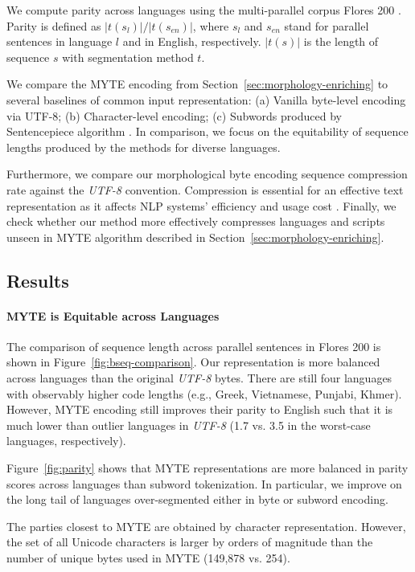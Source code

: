 We compute parity across languages using the multi-parallel corpus Flores 200 \cite{nllb2022}. Parity is defined as $|t(s_l)|/|t(s_{en})|$, where $s_l$ and $s_{en}$ stand for parallel sentences in language $l$ and in English, respectively. $|t(s)|$ is the length of sequence $s$ with segmentation method $t$.

We compare the \textsc{MYTE} encoding from Section~\ref{sec:morphology-enriching} to several baselines of common input representation: (a) Vanilla byte-level encoding via UTF-8; (b) Character-level encoding; (c) Subwords produced by Sentencepiece algorithm \cite{kudo-richardson-2018-sentencepiece}. In comparison, we focus on the equitability of sequence lengths produced by the methods for diverse languages.

Furthermore, we compare our morphological byte encoding sequence compression rate against the \emph{UTF-8} convention. Compression is essential for an effective text representation as it affects NLP systems' efficiency and usage cost \cite{ahia_all_2023}. Finally, we check whether our method more effectively compresses languages and scripts unseen in \textsc{MYTE} algorithm described in Section~\ref{sec:morphology-enriching}.

\subsection{Results}
\label{sec:results-sequences}

\paragraph{\textsc{MYTE} is Equitable across Languages} The comparison of sequence length across parallel sentences in Flores 200 is shown in Figure~\ref{fig:bseq-comparison}. Our representation is more balanced across languages than the original \emph{UTF-8} bytes. There are still four languages with observably higher code lengths (e.g., Greek, Vietnamese, Punjabi, Khmer). However, \textsc{MYTE} encoding still improves their parity to English such that it is much lower than outlier languages in \emph{UTF-8} (1.7 vs. 3.5 in the worst-case languages, respectively).

Figure~\ref{fig:parity} shows that \textsc{MYTE} representations are more balanced in parity scores across languages than subword tokenization. In particular, we improve on the long tail of languages over-segmented either in byte or subword encoding. 

The parties closest to \textsc{MYTE} are obtained by character representation. However, the set of all Unicode characters is larger by orders of magnitude than the number of unique bytes used in \textsc{MYTE} (149,878 vs. 254). 

